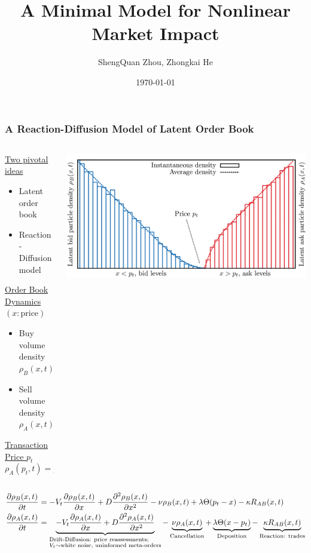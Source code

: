 \documentclass{beamer}
\title[Nonlinear Market Impact]{A Minimal Model for Nonlinear Market Impact}
\author{ShengQuan Zhou, Zhongkai He} %
\institute[Baruch] 
{
Baruch MFE \\ %
}
\date{\today} %
\begin{document}
\begin{frame}
\titlepage %
\end{frame}



\begin{frame}
\frametitle{A Reaction-Diffusion Model of Latent Order Book}
{
\footnotesize{
\begin{columns}
\begin{column}{0.4\textwidth}
   \underline{Two pivotal ideas}
   \begin{itemize}
       \item Latent order book
       \item Reaction-Diffusion model
   \end{itemize}
   \underline{Order Book Dynamics $(x:\text{price})$}
   \begin{itemize}
       \item Buy volume density $\rho_B(x,t)$
       \item Sell volume density $\rho_A(x,t)$
   \end{itemize}
   \underline{Transaction Price $p_t$}
   $$
   \boxed{
       \rho_A(p_t, t) = \rho_B(p_t, t) 
       }  
   $$
\end{column}
\begin{column}{0.6\textwidth}  %
    \begin{center}
     \includegraphics[width=\textwidth,height=.5\textheight]{llob}
     \end{center}
\end{column}
\end{columns}

\begin{align*}
\frac{\partial \rho_B(x,t)}{\partial t} &= -V_t \frac{\partial \rho_B(x,t)}{\partial x}
+ D  \frac{\partial^2 \rho_B(x,t)}{\partial x^2} -\nu \rho_B(x,t) +\lambda \Theta(p_t -x) - \kappa R_{AB}(x,t)\\
\frac{\partial \rho_A(x,t)}{\partial t} &= \underbrace{-V_t \frac{\partial \rho_A(x,t)}{\partial x}
+ D  \frac{\partial^2 \rho_A(x,t)}{\partial x^2}}_{\begin{subarray}{l}\text{\text{Drift-Diffusion: price reassessments;}}\\
    V_t\sim\text{\text{white noise, uninformed meta-orders}}\end{subarray} } -\underbrace{\nu \rho_A(x,t)}_{\text{Cancellation}} +\underbrace{\lambda \Theta(x-p_t)}_{\text{Deposition}} - \underbrace{\kappa R_{AB}(x,t)}_{\text{Reaction: trades}}
\end{align*}

}}
\end{frame}
\end{document}

